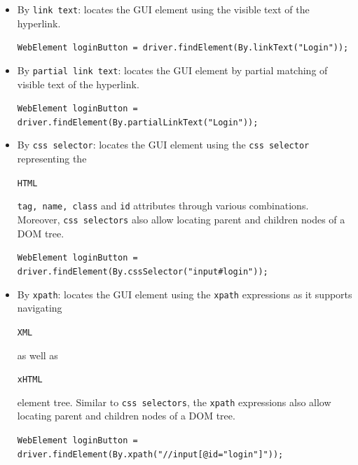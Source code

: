 \begin{itemize}
\item 
By \texttt{link text}:
locates the GUI element using the visible text of the hyperlink.
\newline
\begin{footnotesize}
\texttt{WebElement loginButton = driver.findElement(By.linkText("Login"));
}
\end{footnotesize}

\item 
By \texttt{partial link text}:
locates the GUI element by partial matching of visible text of the hyperlink.
\newline
\begin{footnotesize}
\texttt{WebElement loginButton = driver.findElement(By.partialLinkText("Login"));
}
\end{footnotesize}
\item 
By \texttt{css selector}:
locates the GUI element using the \texttt{css selector} representing the \begin{small}\texttt{HTML}\end{small} \texttt{tag, name, class} and \texttt{id} attributes through various combinations. Moreover, \texttt{css selectors} also allow locating parent and children nodes of a DOM tree. 
\newline
\begin{footnotesize}
\texttt{WebElement loginButton = driver.findElement(By.cssSelector("input\#login"));
}
\end{footnotesize}
\item 
By \texttt{xpath}:
locates the GUI element using the \texttt{xpath} expressions as it supports navigating \begin{small}\texttt{XML}\end{small} as well as \begin{small}\texttt{xHTML}\end{small} element tree. Similar to \texttt{css selectors}, the \texttt{xpath} expressions also allow locating parent and children nodes of a DOM tree. 
\newline
\begin{footnotesize}
\texttt{WebElement loginButton = driver.findElement(By.xpath("//input[@id="login"]"));
}
\end{footnotesize}
\end{itemize}

